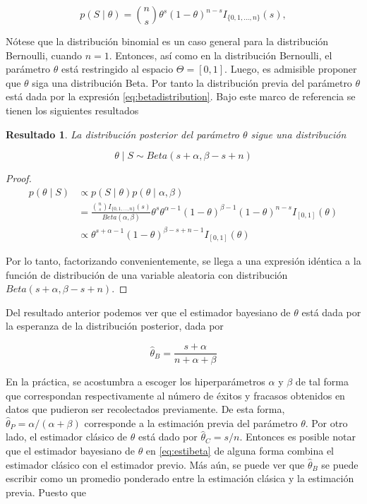 \documentclass[
  10pt,
  spanish,
]{book}
\newtheorem{proposition}{Resultado}[chapter]
\theoremstyle{definition}
\theoremstyle{definition}
\theoremstyle{definition}
\theoremstyle{definition}
\theoremstyle{remark}
\begin{document}
\begin{equation}
p(S \mid \theta)=\binom{n}{s}\theta^s(1-\theta)^{n-s}I_{\{0,1,\ldots,n\}}(s),
\end{equation}

Nótese que la distribución binomial es un caso general para la
distribución Bernoulli, cuando \(n=1\). Entonces, así como en la
distribución Bernoulli, el parámetro \(\theta\) está restringido al
espacio \(\Theta=[0,1]\). Luego, es admisible proponer que \(\theta\) siga
una distribución Beta. Por tanto la distribución previa del parámetro
\(\theta\) está dada por la expresión \eqref{eq:betadistribution}. Bajo
este marco de referencia se tienen los siguientes resultados

\begin{proposition}
\protect\hypertarget{prp:unnamed-chunk-11}{}{\label{prp:unnamed-chunk-11} }La distribución posterior del parámetro \(\theta\) sigue una distribución

\begin{equation*}
\theta \mid S \sim Beta(s+\alpha,\beta-s+n)
\end{equation*}
\end{proposition}

\begin{proof}
{}\begin{align*}
p(\theta \mid S)&\propto p(S \mid \theta)p(\theta \mid \alpha,\beta)\\
&=\frac{\binom{n}{s}I_{\{0,1,\ldots,n\}}(s)}{Beta(\alpha,\beta)}
\theta^s\theta^{\alpha-1} (1-\theta)^{\beta-1}(1-\theta)^{n-s}I_{[0,1]}(\theta)\\
&\propto \theta^{s+\alpha-1} (1-\theta)^{\beta-s+n-1}I_{[0,1]}(\theta)
\end{align*}

Por lo tanto, factorizando convenientemente, se llega a una expresión idéntica a la función de distribución de una variable aleatoria con distribución \(Beta(s+\alpha,\beta-s+n)\).
\end{proof}

Del resultado anterior podemos ver que el estimador bayesiano de
\(\theta\) está dada por la esperanza de la distribución posterior, dada
por

\begin{equation}
\label{eq:estibeta}
\hat{\theta}_{B}=\frac{s+\alpha}{n+\alpha+\beta}
\end{equation}

En la práctica, se acostumbra a escoger los hiperparámetros \(\alpha\) y
\(\beta\) de tal forma que correspondan respectivamente al número de
éxitos y fracasos obtenidos en datos que pudieron ser recolectados
previamente. De esta forma, \(\hat{\theta}_{P}=\alpha/(\alpha+\beta)\)
corresponde a la estimación previa del parámetro \(\theta\). Por otro
lado, el estimador clásico de \(\theta\) está dado por
\(\hat{\theta}_{C}=s/n\). Entonces es posible notar que el estimador
bayesiano de \(\theta\) en \eqref{eq:estibeta} de alguna forma combina el
estimador clásico con el estimador previo. Más aún, se puede ver que
\(\hat{\theta}_{B}\) se puede escribir como un promedio ponderado entre la
estimación clásica y la estimación previa. Puesto que
\end{document}
